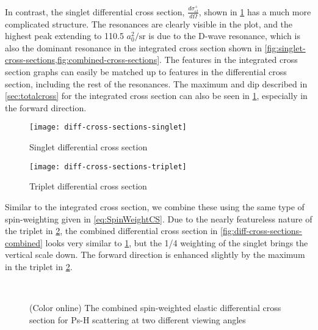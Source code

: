 \documentclass[Dissertation.tex]{subfiles}
\begin{document}
In contrast, the singlet differential cross section, $\frac{d\sigma_{el}^+}{d\Omega}$,
shown in \cref{fig:diff-cross-sections-singlet} has a much more complicated
structure. The resonances are clearly visible in the plot, and the highest peak
extending to 110.5 $a_0^2/\textrm{sr}$ is due to the D-wave resonance, which is
also the dominant resonance in the integrated cross section shown in
\cref{fig:singlet-cross-sections,fig:combined-cross-sections}. The features in
the integrated cross section graphs can easily be matched up to features in the
differential cross section, including the rest of the resonances. The maximum
and dip described in \cref{sec:totalcross} for the integrated cross section can
also be seen in \cref{fig:diff-cross-sections-singlet}, especially in the
forward direction.

\begin{figure}[H]
	\centering
	\texttt{[image: diff-cross-sections-singlet]}
	\caption{Singlet differential cross section}
	\label{fig:diff-cross-sections-singlet}
\end{figure}

\begin{figure}[H]
	\centering
	\texttt{[image: diff-cross-sections-triplet]}
	\caption{Triplet differential cross section}
	\label{fig:diff-cross-sections-triplet}
\end{figure}

Similar to the integrated cross section, we combine these using the same type
of spin-weighting given in \cref{eq:SpinWeightCS}. Due to the nearly featureless
nature of the triplet in \cref{fig:diff-cross-sections-triplet},
the combined differential cross section in 
\cref{fig:diff-cross-sections-combined} looks very similar to 
\cref{fig:diff-cross-sections-singlet}, but the 1/4 weighting of the singlet
brings the vertical scale down. The forward direction is enhanced slightly by
the maximum in the triplet in \cref{fig:diff-cross-sections-triplet}.

\begin{figure}[H]%
    \centering
     \\%
    \caption{(Color online) The combined spin-weighted elastic differential cross section for Ps-H scattering at two different viewing angles}%
    \label{fig:combined-diff-cross-sections}%
\end{figure}
\end{document}
